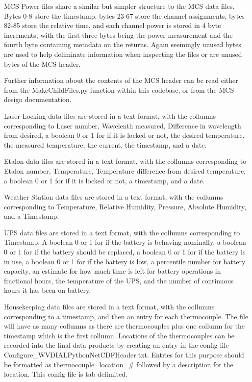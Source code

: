 MCS Power files share a similar but simpler structure to the MCS data files. Bytes 0-8 store the timestamp, bytes 23-67 store the channel assignments, bytes 82-85 store the relative time, and each channel power is stored in 4 byte increments, with the first three bytes being the power measurement and the fourth byte containing metadata on the returns. Again seemingly unused bytes are used to help deliminate information when inspecting the files or are unused bytes of the MCS header. 

Further information about the contents of the MCS header can be read either from the MakeChildFiles.py function within this codebase, or from the MCS design documentation. 

Laser Locking data files are stored in a text format, with the collumns corresponding to Laser number, Wavelenth measured, Difference in wavelength from desired, a boolean 0 or 1 for if it is locked or not, the desired temperature, the measured temperature, the current, the timestamp, and a date. 

Etalon data files are stored in a text format, with the collumns corresponding to Etalon number, Temperature, Temperature difference from desired temperature, a boolean 0 or 1 for if it is locked or not, a timestamp, and a date. 

Weather Station data files are stored in a text format, with the collumns corresponding to Temperature, Relative Humidity, Pressure, Absolute Humidity, and a Timestamp. 

UPS data files are stored in a text format, with the collumns corresponding to Timestamp, A boolean 0 or 1 for if the battery is behaving nominally, a boolean 0 or 1 for if the battery should be replaced, a boolean 0 or 1 for if the battery is in use, a boolean 0 or 1 for if the battery is low, a percentile number for battery capacity, an estimate for how much time is left for battery operations in fractional hours, the temperature of the UPS, and the number of continuous hours it has been on battery. 

Housekeeping data files are stored in a text format, with the collumns corresponding to a timestamp, and then an entry for each thermocouple. The file will have as many collumns as there are thermocouples plus one collumn for the timestamp which is the first collumn. Locations of the thermocouples can be recorded into the final data products by creating an entry in the config file Configure\_WVDIALPythonNetCDFHeader.txt. Entries for this purpose should be formatted as thermocouple\_location\_\# followed by a description for the location. This config file is tab delimited. 


